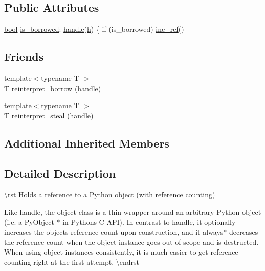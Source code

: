 \subsection*{Public Attributes}
\begin{DoxyCompactItemize}
\item 
\mbox{\hyperlink{asdl_8h_af6a258d8f3ee5206d682d799316314b1}{bool}} \mbox{\hyperlink{classobject_a4ebda2f2d08435f4d70d822908d7e431}{is\+\_\+borrowed}}\+: \mbox{\hyperlink{classhandle}{handle}}(\mbox{\hyperlink{_s_d_l__opengl__glext_8h_afa0fb1b5e976920c0abeff2dca3ed774}{h}}) \{ if (is\+\_\+borrowed) \mbox{\hyperlink{classhandle_ab9c5f2cbecb0b37f53765b1c501b7451}{inc\+\_\+ref}}()
\end{DoxyCompactItemize}
\subsection*{Friends}
\begin{DoxyCompactItemize}
\item 
{\footnotesize template$<$typename T $>$ }\\T \mbox{\hyperlink{classobject_ac1ea1a4cbcf197d7c8096037633720d7}{reinterpret\+\_\+borrow}} (\mbox{\hyperlink{classhandle}{handle}})
\item 
{\footnotesize template$<$typename T $>$ }\\T \mbox{\hyperlink{classobject_ae1de2ab5a755c10582ac1e46071de5c5}{reinterpret\+\_\+steal}} (\mbox{\hyperlink{classhandle}{handle}})
\end{DoxyCompactItemize}
\subsection*{Additional Inherited Members}


\subsection{Detailed Description}
\textbackslash{}rst Holds a reference to a Python object (with reference counting)

Like {\ttfamily handle}, the {\ttfamily object} class is a thin wrapper around an arbitrary Python object (i.\+e. a {\ttfamily Py\+Object $\ast$} in Python\textquotesingle{}s C A\+PI). In contrast to {\ttfamily handle}, it optionally increases the object\textquotesingle{}s reference count upon construction, and it always$\ast$ decreases the reference count when the {\ttfamily object} instance goes out of scope and is destructed. When using {\ttfamily object} instances consistently, it is much easier to get reference counting right at the first attempt. \textbackslash{}endrst 

